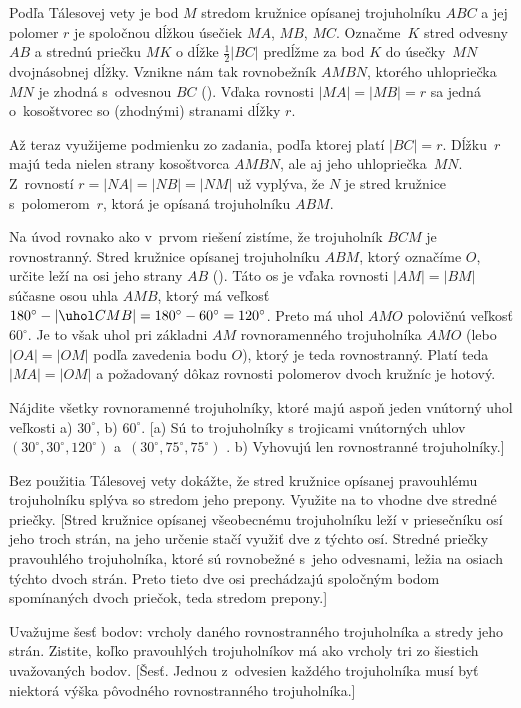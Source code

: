 {\ineriesenie
Podľa Tálesovej vety je bod $M$ stredom kružnice
opísanej trojuholníku $ABC$ a jej polomer $r$ je spoločnou dĺžkou
úsečiek $MA$, $MB$, $MC$. Označme~$K$ stred odvesny $AB$ a
strednú priečku $MK$ o dĺžke $\frac12|BC|$ predĺžme za bod $K$
do úsečky~$MN$ dvojnásobnej dĺžky. Vznikne nám tak rovnobežník
$AMBN$, ktorého uhlopriečka $MN$ je zhodná s~odvesnou $BC$ (\obr). Vďaka rovnosti
$|MA|=|MB|=r$ sa jedná o~kosoštvorec so (zhodnými) stranami dĺžky $r$.
%

Až teraz využijeme podmienku zo zadania, podľa ktorej platí $|BC|=r$.
Dĺžku~$r$ majú teda nielen strany kosoštvorca $AMBN$, ale
aj jeho uhlopriečka~$MN$. Z~rovností $r=|NA|=|NB|=|NM|$ už vyplýva,
že $N$ je stred kružnice s~polomerom~$r$, ktorá je opísaná
trojuholníku $ABM$.

\ineriesenie
Na úvod rovnako ako v~prvom riešení zistíme, že trojuholník $BCM$ je
rovnostranný. Stred kružnice opísanej trojuholníku $ABM$, ktorý
označíme $O$, určite leží na osi jeho strany $AB$ (\obr).
Táto os je vďaka rovnosti $|AM|=|BM|$ súčasne osou uhla $AMB$,
ktorý má veľkosť $180^{\circ}-|\uhol CMB|=180^{\circ}-60^{\circ}=120^{\circ}$.
Preto má uhol $AMO$ polovičnú veľkosť $60^{\circ}$.
Je to však uhol pri základni $AM$ rovnoramenného trojuholníka $AMO$
(lebo $|OA|=|OM|$ podľa zavedenia bodu $O$),
ktorý je teda rovnostranný. Platí teda $|MA|=|OM|$ a požadovaný
dôkaz rovnosti polomerov dvoch kružníc je hotový.
%


Nájdite všetky rovnoramenné trojuholníky, ktoré majú aspoň jeden
vnútorný uhol veľkosti a) $30^{\circ}$, b) $60^{\circ}$.
[a) Sú to trojuholníky s trojicami vnútorných uhlov
$(30^{\circ},30^{\circ},120^{\circ})$ a~$(30^{\circ},75^{\circ},75^{\circ})$ . b) Vyhovujú len
rovnostranné trojuholníky.]

Bez použitia Tálesovej vety dokážte, že stred kružnice opísanej
pravouhlému trojuholníku splýva so stredom jeho prepony. Využite
na to vhodne dve stredné priečky.
[Stred kružnice opísanej všeobecnému trojuholníku leží v priesečníku osí
jeho troch strán, na jeho určenie stačí využiť dve z týchto osí.
Stredné priečky pravouhlého trojuholníka, ktoré sú rovnobežné s~jeho
odvesnami, ležia na osiach týchto dvoch strán. Preto tieto dve osi
prechádzajú spoločným bodom spomínaných dvoch priečok, teda stredom
prepony.]


Uvažujme šesť bodov: vrcholy daného rovnostranného trojuholníka
a stredy jeho strán. Zistite, koľko pravouhlých trojuholníkov má
ako vrcholy tri zo šiestich uvažovaných bodov.
[Šesť. Jednou z~odvesien každého trojuholníka musí byť
niektorá výška pôvodného rovnostranného trojuholníka.]

}

